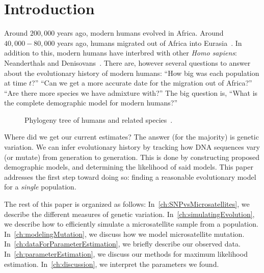 \chapter{Introduction}\label{ch:introduction}
Around $200,000$ years ago, modern humans evolved in Africa.
Around $40,000 - 80,000$ years ago, humans migrated out of Africa into Eurasia~\cite{campbellEvolutionHumanGenetic2010}.
In addition to this, modern humans have interbred with other \textit{Homo sapiens}: Neanderthals and
Denisovans~\cite{sankararamanCombinedLandscapeDenisovan2016}.
There are, however several questions to answer about the evolutionary history of modern humans:
``How big was each population at time $t$?''
``Can we get a more accurate date for the migration out of Africa?''
``Are there more species we have admixture with?''
The big question is, ``What is the complete demographic model for modern humans?''
\begin{figure}[th]
    \caption{
    Phylogeny tree of humans and related species~\cite{riceReview18Organic}.
    }\label{fig:overviewEvolution}
\end{figure}

Where did we get our current estimates?
The answer (for the majority) is genetic variation.
We can infer evolutionary history by tracking how DNA sequences vary (or mutate) from generation to generation.
This is done by constructing proposed demographic models, and determining the likelihood of said models.
This paper addresses the first step toward doing so: finding a reasonable evolutionary model for a \emph{single}
population.

The rest of this paper is organized as follows:
In~\autoref{ch:SNPvsMicrosatellites}, we describe the different measures of genetic variation.
In~\autoref{ch:simulatingEvolution}, we describe how to efficiently simulate a microsatellite sample from a population.
In~\autoref{ch:modelingMutation}, we discuss how we model microsatellite mutation.
In~\autoref{ch:dataForParameterEstimation}, we briefly describe our observed data.
In~\autoref{ch:parameterEstimation}, we discuss our methods for maximum likelihood estimation.
In~\autoref{ch:discussion}, we interpret the parameters we found.
